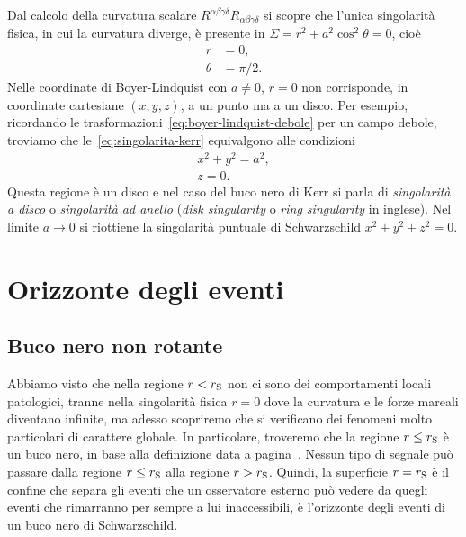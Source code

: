 Dal calcolo della curvatura scalare
\(R^{\alpha\beta\gamma\delta}R_{\alpha\beta\gamma\delta}\) si scopre che l'unica
singolarità fisica, in cui la curvatura diverge, è presente in \(\Sigma = r^{2}
+ a^{2}\cos^{2}\theta = 0\), cioè
\begin{subequations}
  \label{eq:singolarita-kerr}
  \begin{align}
    r &= 0, \\
    \theta &= \pi/2.
  \end{align}
\end{subequations}
Nelle coordinate di Boyer-Lindquist con \(a \neq 0\), \(r = 0\) non corrisponde,
in coordinate cartesiane \((x, y, z)\), a un punto ma a un disco.  Per esempio,
ricordando le trasformazioni~\eqref{eq:boyer-lindquist-debole} per un campo
debole, troviamo che le~\eqref{eq:singolarita-kerr} equivalgono alle condizioni
\begin{subequations}
  \begin{gather}
    x^{2} + y^{2} = a^{2}, \\
    z = 0.
  \end{gather}
\end{subequations}
Questa regione è un disco e nel caso del buco nero di Kerr si parla di
\emph{singolarità a disco} o \emph{singolarità ad anello} (\emph{disk
  singularity} o \emph{ring singularity} in inglese).  Nel limite \(a\to 0\) si
riottiene la singolarità puntuale di Schwarzschild \(x^{2} + y^{2} + z^{2} =
0\).

\section{Orizzonte degli eventi}
\label{sec:orizzonte-eventi}

\subsection{Buco nero non rotante}
\label{sec:orizzonte-schwarzschild}

Abbiamo visto che nella regione \(r < r_{\textup{S}}\) non ci sono dei
comportamenti locali patologici, tranne nella singolarità fisica \(r = 0\) dove
la curvatura e le forze mareali diventano infinite, ma adesso scopriremo che si
verificano dei fenomeni molto particolari di carattere globale.  In particolare,
troveremo che la regione \(r \leq r_{\textup{S}}\) è un buco nero, in base alla
definizione data a pagina~\pageref{definizione-buco-nero}.  Nessun tipo di
segnale può passare dalla regione \(r\leq r_{\textup{S}}\) alla regione \(r >
r_{\textup{S}}\).  Quindi, la superficie \(r = r_{\textup{S}}\) è il confine che
separa gli eventi che un osservatore esterno può vedere da quegli eventi che
rimarranno per sempre a lui inaccessibili, è l'orizzonte degli eventi di un buco
nero di Schwarzschild.

